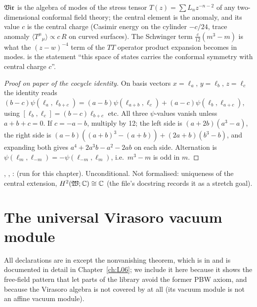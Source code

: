 \begin{physics}
$\mathfrak{Vir}$ is the algebra of modes of the stress tensor $T(z) = \sum L_nz^{-n-2}$ of any
two-dimensional conformal field theory; the central element is the anomaly, and its value $c$ is
the central charge (Casimir energy on the cylinder $-c/24$, trace anomaly
$\langle T^\mu{}_\mu\rangle\propto c\,R$ on curved surfaces). The Schwinger term
$\frac{c}{12}(m^3-m)$ is what the $(z-w)^{-4}$ term of the $TT$ operator product expansion becomes in
modes.  is the statement ``this space of states carries the conformal symmetry with
central charge $c$''.
\end{physics}

\begin{proof}[Proof on paper of the cocycle identity]
On basis vectors $x = \ell_a$, $y=\ell_b$, $z=\ell_c$ the identity reads
$(b-c)\psi(\ell_a,\ell_{b+c}) = (a-b)\psi(\ell_{a+b},\ell_c) + (a-c)\psi(\ell_b,\ell_{a+c})$,
using $[\ell_b,\ell_c] = (b-c)\ell_{b+c}$ etc. All three $\psi$-values vanish unless $a+b+c=0$. If
$c = -a-b$, multiply by 12; the left side is $(a+2b)(a^3-a)$, the right side is
$(a-b)((a+b)^3-(a+b)) + (2a+b)(b^3-b)$, and expanding both gives
$a^4+2a^3b-a^2-2ab$ on each side. Alternation is $\psi(\ell_m,\ell_{-m}) = -\psi(\ell_{-m},\ell_m)$,
i.e.\ $m^3-m$ is odd in $m$.
\end{proof}

\begin{status}
\allowbreak{}\allowbreak{}, \allowbreak{}, :
 (run for this chapter). Unconditional.
Not formalised: uniqueness of the central extension, $H^2(\mathfrak{W};{\mathbb{C}})\cong{\mathbb{C}}$ (the file's docstring
records it as a stretch goal).
\end{status}

\section{The universal Virasoro vacuum module}\label{l02:sec:virmod}

All declarations are in  except the
nonvanishing theorem, which is in  and is
documented in detail in Chapter~\ref{ch:L06}; we include it here because it shows the free-field
pattern that let parts of the library avoid the former PBW axiom, and because the Virasoro algebra
is not covered by  at all (its vacuum module is not an affine vacuum module).

